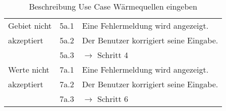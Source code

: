 \begin{table} [H]
\begin{tabular}{|l|l|l|}
		\hline
		Gebiet nicht & 5a.1 & Eine Fehlermeldung wird angezeigt.\\
		\cline{2-3}
		akzeptiert 	& 5a.2	& Der Benutzer korrigiert seine Eingabe.\\
		\cline{2-3}
					& 5a.3 	& $\rightarrow$ Schritt 4\\
		\hline
		Werte nicht & 7a.1 	& Eine Fehlermeldung wird angezeigt.\\
		\cline{2-3}
		akzeptiert 	& 7a.2	& Der Benutzer korrigiert seine Eingabe.\\
		\cline{2-3}
					& 7a.3 	& $\rightarrow$ Schritt 6\\
		\hline
	\end{tabular}
	\caption{Beschreibung Use Case Wärmequellen eingeben}
	\label{Beschreibung Use Case Wärmequellen_eingeben}
\end{table}

